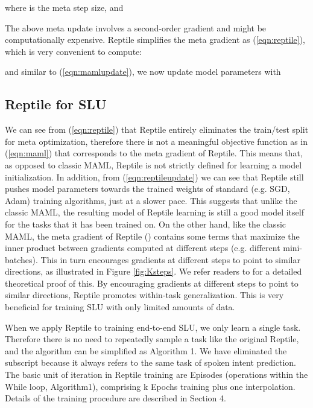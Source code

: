 \documentclass[a4paper]{article}
\begin{document}
	where  is the meta step size, and
	
	
	The above meta update involves a second-order gradient and might be computationally expensive. Reptile simplifies the meta gradient as (\ref{eqn:reptile}), which is very convenient to compute:
	
	
	and similar to (\ref{eqn:mamlupdate}), we now update model parameters  with
	
	
	
	\subsection{Reptile for SLU}
	We can see from (\ref{eqn:reptile}) that Reptile entirely eliminates the train/test split for meta optimization, therefore there is not a meaningful objective function as in (\ref{eqn:maml}) that corresponds to the meta gradient of Reptile. This means that, as opposed to classic MAML, Reptile is not strictly defined for learning a model initialization. In addition, from (\ref{eqn:reptileupdate}) we can see that Reptile still pushes model parameters towards the trained weights of standard (e.g. SGD, Adam) training algorithms, just at a slower pace. This suggests that unlike the classic MAML, the resulting model of Reptile learning is still a good model itself for the tasks that it has been trained on. On the other hand, like the classic MAML, the meta gradient of Reptile () contains some terms that maximize the inner product between gradients computed at different steps (e.g. different mini-batches). This in turn encourages gradients at different steps to point to similar directions, as illustrated in Figure \ref{fig:Ksteps}. We refer readers to \cite{Reptile} for a detailed theoretical proof of this. By encouraging gradients at different steps to point to similar directions, Reptile promotes within-task generalization. This is very beneficial for training SLU with only limited amounts of data. 
	
	When we apply Reptile to training end-to-end SLU, we only learn a single task. Therefore there is no need to repeatedly sample a task like the original Reptile, and the algorithm can be simplified as Algorithm 1. We have eliminated the subscript  because it always refers to the same task of spoken intent prediction. The basic unit of iteration in Reptile training are Episodes (operations within the While loop, Algorithm1), comprising k Epochs training plus one interpolation. Details of the training procedure are described in Section 4.
	
\end{document}
